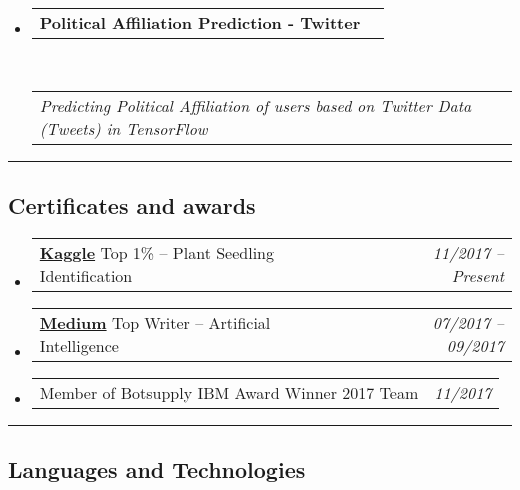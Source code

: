 \documentclass[10pt,letterpaper]{article}
\makeatletter
\newcommand{\headerrow}[2]
{\begin{tabular*}{\linewidth}{l@{\extracolsep{\fill}}r}
	#1 &
	#2 \\
\end{tabular*}}
\makeatother
\begin{document}
\begin{itemize}
\begin{itemize*}
	\end{itemize*}
	
		\item 
	\headerrow
		{\textbf{\color{BrickRed}Political Affiliation Prediction - Twitter}}
			{\textbf{}}
	\\
	\headerrow
		{\emph{\color{OliveGreen}Predicting Political Affiliation of users based on Twitter Data (Tweets) in TensorFlow}}
		{\emph{}}
	
\end{itemize}

\hrule
\vspace{-0.4em}
\subsection*{\color{MidnightBlue}Certificates and awards}

\begin{itemize}
	\parskip=0.1em
	
	\item 
	\headerrow
		{{\textbf{\href{https://www.kaggle.com/shridhar743}{Kaggle}}} Top 1\% -- Plant Seedling Identification}
		{\emph{11/2017 -- Present}}
	\item 
	\headerrow
		{{\textbf{\href{https://medium.com/@shridhar743}{Medium}}} Top Writer -- Artificial Intelligence}
		{\emph{07/2017 -- 09/2017}}
	\item 
	\headerrow
		{Member of Botsupply IBM Award Winner 2017 Team}
		{\emph{11/2017}}	

\end{itemize}

\hrule
\vspace{-0.4em}
\subsection*{\color{MidnightBlue}Languages and Technologies}
\end{document}
